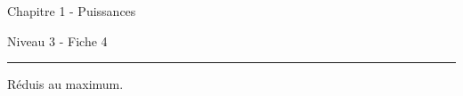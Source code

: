 \begin{exercise}
\begin{enumerate}[cols=3]
  \end{enumerate}
\end{exercise}



\newpage
\begin{center}
  \bfseries
  \begin{Huge}
    Chapitre 1 - Puissances
  \end{Huge}
  \smallbreak
  \begin{large}
    Niveau 3  - Fiche 4
  \end{large}
  \smallbreak
  \rule[10pt]{.5\linewidth}{1 pt}
\end{center}

\setcounter{exercise}{0}

\begin{exercise}
  Réduis au maximum.
  \begin{enumerate}[cols=3]


\end{enumerate}
\end{exercise}
